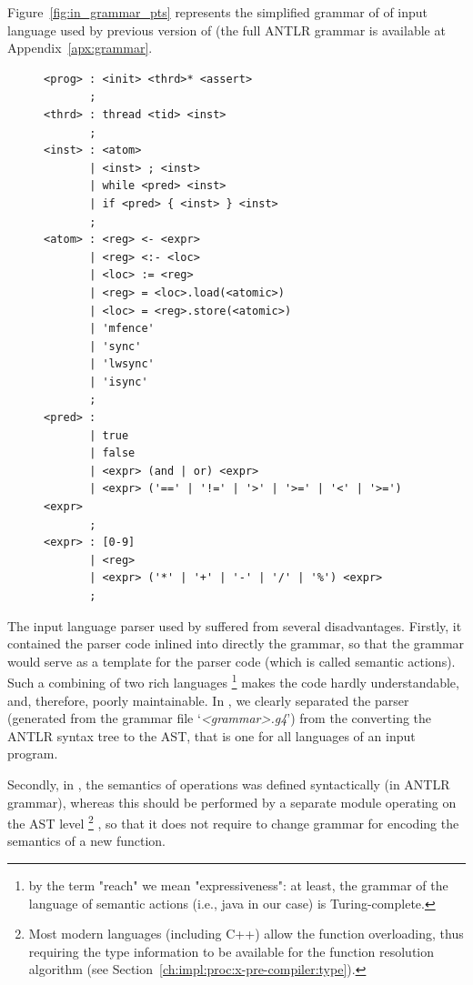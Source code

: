 Figure~\ref{fig:in_grammar_pts} represents the simplified grammar of of input language used by previous version of \porthos{} (the full ANTLR grammar is available at Appendix~\ref{apx:grammar}.

\begin{figure}[!h]%
\centering
\begin{lstlisting}[language=antlr,
                  basicstyle=\ttfamily\tiny,
                  caption={The sketch of the input language grammar used by \oldporthos},%
                  label={fig:in_grammar_pts}]
<prog> : <init> <thrd>* <assert>
       ;
<thrd> : thread <tid> <inst>
       ;
<inst> : <atom>
       | <inst> ; <inst>
       | while <pred> <inst>
       | if <pred> { <inst> } <inst>
       ;
<atom> : <reg> <- <expr>
       | <reg> <:- <loc>
       | <loc> := <reg>
       | <reg> = <loc>.load(<atomic>)
       | <loc> = <reg>.store(<atomic>)
       | 'mfence'
       | 'sync'
       | 'lwsync'
       | 'isync'
       ;
<pred> :
       | true
       | false
       | <expr> (and | or) <expr>
       | <expr> ('==' | '!=' | '>' | '>=' | '<' | '>=') <expr>
       ;
<expr> : [0-9]
       | <reg>
       | <expr> ('*' | '+' | '-' | '/' | '%') <expr>
       ;
\end{lstlisting}
\end{figure}

The input language parser used by \porthos[1] suffered from several disadvantages.
Firstly, it contained the parser code inlined into directly the grammar, so that the grammar would serve as a template for the parser code (which is called semantic actions). Such a combining of two rich languages%
\footnote{by the term "reach" we mean "expressiveness": at least, the grammar of the language of semantic actions (i.e., java in our case) is Turing-complete.} %
makes the code hardly understandable, and, therefore, poorly maintainable. In \porthos[2], we clearly separated the parser (generated from the grammar file `\textit{<grammar>.g4}') from the converting the ANTLR syntax tree to the AST, that is one for all  languages of an input program.

Secondly, in \porthos[1], the semantics of operations was defined syntactically (in ANTLR grammar), whereas this should be performed by a separate module operating on the AST level%
\footnote{Most modern languages (including C++) allow the function overloading, thus requiring the type information to be available for the function resolution algorithm (see Section~\ref{ch:impl:proc:x-pre-compiler:type}).}%
, so that it does not require to change grammar for encoding the semantics of a new function. %

